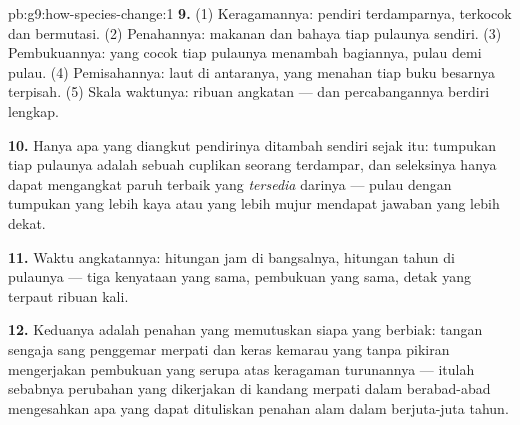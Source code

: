 \begin{solution}{pb:g9:how-species-change:1}
\textbf{9.} (1) Keragamannya: pendiri terdamparnya, terkocok
dan bermutasi. (2) Penahannya: makanan dan bahaya tiap
pulaunya sendiri. (3) Pembukuannya:  yang cocok tiap
pulaunya menambah bagiannya, pulau demi pulau. (4)
Pemisahannya: laut di antaranya, yang menahan tiap buku
besarnya terpisah. (5) Skala waktunya: ribuan angkatan ---
dan percabangannya berdiri lengkap.

\textbf{10.} Hanya apa yang diangkut pendirinya ditambah
 sendiri sejak itu: tumpukan tiap pulaunya adalah
sebuah cuplikan seorang terdampar, dan seleksinya hanya dapat
mengangkat paruh terbaik yang \emph{tersedia} darinya ---
pulau dengan tumpukan yang lebih kaya atau  yang lebih
mujur mendapat jawaban yang lebih dekat.

\textbf{11.} Waktu angkatannya: hitungan jam di bangsalnya,
hitungan tahun di pulaunya --- tiga kenyataan yang sama,
pembukuan yang sama, detak yang terpaut ribuan kali.

\textbf{12.} Keduanya adalah penahan yang memutuskan siapa
yang berbiak: tangan sengaja sang penggemar merpati dan 
keras kemarau yang tanpa pikiran mengerjakan pembukuan yang
serupa atas keragaman turunannya --- itulah sebabnya
perubahan yang dikerjakan di kandang merpati dalam
berabad-abad mengesahkan apa yang dapat dituliskan penahan
alam dalam berjuta-juta tahun.
\end{solution}

